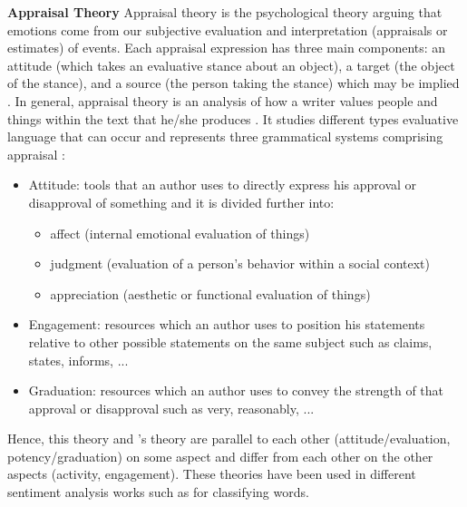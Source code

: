 \documentclass[11pt,a4paper]{article}
\begin{document}
\textbf{Appraisal Theory}
Appraisal theory is the psychological theory arguing that emotions come from our subjective evaluation and interpretation (appraisals or estimates) of events. Each appraisal expression has three main components: an attitude (which takes an evaluative stance about an object), a target (the object of the stance), and a source (the person taking the stance) which may be implied \cite{whitelaw}.
In general, appraisal theory is an analysis of how a writer values people and things within the text that he/she produces \cite{martin}. It studies different types evaluative language that can occur and represents three grammatical systems comprising appraisal \cite{bloom}:
\begin{itemize}
\item Attitude: tools that an author uses to directly express his approval or disapproval of something and it is divided further into:
\begin{itemize}
\item affect (internal emotional evaluation of things)
\item judgment (evaluation of a person's behavior within a social context)
\item appreciation (aesthetic or functional evaluation of things)
\end{itemize}
\item Engagement: resources which an author uses to position his statements relative to other possible statements on the same subject such as claims, states, informs, ...
\item Graduation: resources which an author uses to convey the strength of that approval or disapproval such as very, reasonably, ...
\end{itemize}
Hence, this theory and \citet{osgood}'s theory are parallel to each other (attitude/evaluation, potency/graduation) on some aspect and differ from each other on the other aspects (activity, engagement). These theories have been used in different sentiment analysis works such as \cite{mullen, kamps} for classifying words.

\end{document}

